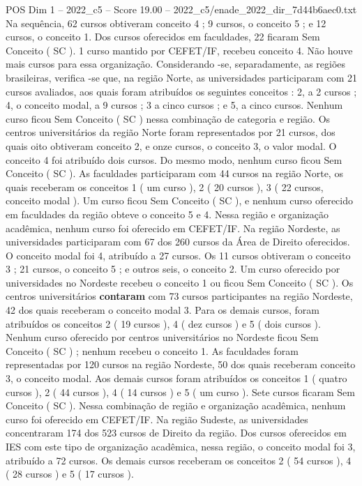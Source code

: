 \begin{textsample}{POS Dim 1 – 2022\_c5 – Score 19.00 – 2022\_c5/enade\_2022\_dir\_7d44b6aec0.txt}
Na sequência, 62 cursos obtiveram conceito 4 ; 9 cursos, o conceito 5 ; e 12 cursos, o conceito 1.
Dos cursos oferecidos em faculdades, 22 ficaram Sem Conceito ( SC ). 1 curso mantido por CEFET/IF, recebeu conceito 4.
Não houve mais cursos para essa organização.
Considerando -se, separadamente, as regiões brasileiras, verifica -se que, na região Norte, as universidades participaram com 21 cursos avaliados, aos quais foram atribuídos os seguintes conceitos : 2, a 2 cursos ; 4, o conceito modal, a 9 cursos ; 3 a cinco cursos ; e 5, a cinco cursos.
Nenhum curso ficou Sem Conceito ( SC ) nessa combinação de categoria e região.
Os centros universitários da região Norte foram representados por 21 cursos, dos quais oito obtiveram conceito 2, e onze cursos, o conceito 3, o valor modal.
O conceito 4 foi atribuído dois cursos.
Do mesmo modo, nenhum curso ficou Sem Conceito ( SC ).
As faculdades participaram com 44 cursos na região Norte, os quais receberam os conceitos 1 ( um curso ), 2 ( 20 cursos ), 3 ( 22 cursos, conceito modal ).
Um curso ficou Sem Conceito ( SC ), e nenhum curso oferecido em faculdades da região obteve o conceito 5 e 4.
Nessa região e organização acadêmica, nenhum curso foi oferecido em CEFET/IF.
Na região Nordeste, as universidades participaram com 67 dos 260 cursos da Área de Direito oferecidos.
O conceito modal foi 4, atribuído a 27 cursos.
Os 11 cursos obtiveram o conceito 3 ; 21 cursos, o conceito 5 ; e outros seis, o conceito 2.
Um curso oferecido por universidades no Nordeste recebeu o conceito 1 ou ficou Sem Conceito ( SC ).
Os centros universitários \textbf{contaram} com 73 cursos participantes na região Nordeste, 42 dos quais receberam o conceito modal 3.
Para os demais cursos, foram atribuídos os conceitos 2 ( 19 cursos ), 4 ( dez cursos ) e 5 ( dois cursos ).
Nenhum curso oferecido por centros universitários no Nordeste ficou Sem Conceito ( SC ) ; nenhum recebeu o conceito 1.
As faculdades foram representadas por 120 cursos na região Nordeste, 50 dos quais receberam conceito 3, o conceito modal.
Aos demais cursos foram atribuídos os conceitos 1 ( quatro cursos ), 2 ( 44 cursos ), 4 ( 14 cursos ) e 5 ( um curso ).
Sete cursos ficaram Sem Conceito ( SC ).
Nessa combinação de região e organização acadêmica, nenhum curso foi oferecido em CEFET/IF.
Na região Sudeste, as universidades concentraram 174 dos 523 cursos de Direito da região.
Dos cursos oferecidos em IES com este tipo de organização acadêmica, nessa região, o conceito modal foi 3, atribuído a 72 cursos.
Os demais cursos receberam os conceitos 2 ( 54 cursos ), 4 ( 28 cursos ) e 5 ( 17 cursos ).

\end{textsample}

